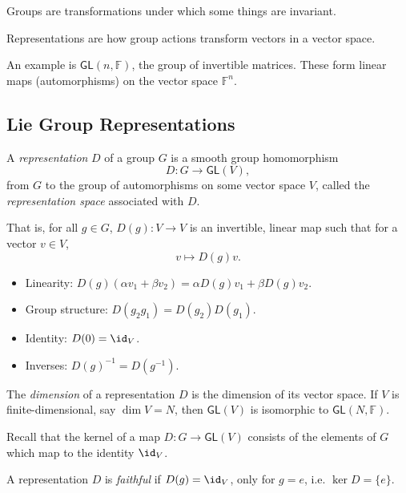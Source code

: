 \documentclass[12pt]{article}
\begin{document}
Groups are transformations under which some things are invariant.

Representations are how group actions transform vectors in a vector space.

An example is $\mathsf{GL}(n, \mathbb{F})$, the group of invertible matrices. These form linear maps (automorphisms) on the vector space $\mathbb{F}^n$.

\subsection{Lie Group Representations}%
\label{sub:lie_rep}

\begin{definition}
	A \emph{representation} $D$ of a group $G$ is a smooth group homomorphism
	\[
	D : G \to \mathsf{GL}(V),
	\]
	from $G$ to the group of automorphisms on some vector space $V$, called the \emph{representation space} associated with $D$.

	That is, for all $g \in G$, $D(g) : V \to V$ is an invertible, linear map such that for a vector $v \in V$,
	\[
	v \mapsto D(g) v.
	\]
	\begin{itemize}
		\item Linearity: $D(g)(\alpha v_1 + \beta v_2) = \alpha D(g) v_1 + \beta D(g) v_2$.
		\item Group structure: $D(g_2 g_1) = D(g_2) D(g_1)$.
		\item Identity: $D(0) = \id_V$.
		\item Inverses: $D(g)^{-1} = D(g^{-1})$.
	\end{itemize}
\end{definition}

\begin{definition}
	The \emph{dimension} of a representation $D$ is the dimension of its vector space. If $V$ is finite-dimensional, say $\dim V = N$, then $\mathsf{GL}(V)$ is isomorphic to $\mathsf{GL}(N, \mathbb{F})$.
\end{definition}


Recall that the kernel of a map $D : G \to \mathsf{GL}(V)$ consists of the elements of $G$ which map to the identity $\id_V$.

\begin{definition}
	A representation $D$ is \emph{faithful} if $D(g) = \id_V$, only for $g = e$, i.e. $\ker D = \{e\}$.
\end{definition}
\end{document}
